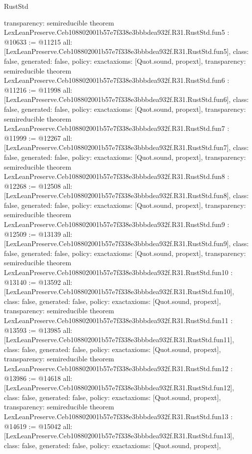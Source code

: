 \begin{lexlean}{RustStd}
\begin{coremodule}
{  transparency: semireducible
}
theorem LexLeanPreserve.Ceb108802001b57e7f338e3bbbdea932f.R31.RustStd.fun5 : @10633 := @11215 {
  all: [LexLeanPreserve.Ceb108802001b57e7f338e3bbbdea932f.R31.RustStd.fun5],
  class: false,
  generated: false,
  policy: exact{axioms: [Quot.sound, propext]},
  transparency: semireducible
}
theorem LexLeanPreserve.Ceb108802001b57e7f338e3bbbdea932f.R31.RustStd.fun6 : @11216 := @11998 {
  all: [LexLeanPreserve.Ceb108802001b57e7f338e3bbbdea932f.R31.RustStd.fun6],
  class: false,
  generated: false,
  policy: exact{axioms: [Quot.sound, propext]},
  transparency: semireducible
}
theorem LexLeanPreserve.Ceb108802001b57e7f338e3bbbdea932f.R31.RustStd.fun7 : @11999 := @12267 {
  all: [LexLeanPreserve.Ceb108802001b57e7f338e3bbbdea932f.R31.RustStd.fun7],
  class: false,
  generated: false,
  policy: exact{axioms: [Quot.sound, propext]},
  transparency: semireducible
}
theorem LexLeanPreserve.Ceb108802001b57e7f338e3bbbdea932f.R31.RustStd.fun8 : @12268 := @12508 {
  all: [LexLeanPreserve.Ceb108802001b57e7f338e3bbbdea932f.R31.RustStd.fun8],
  class: false,
  generated: false,
  policy: exact{axioms: [Quot.sound, propext]},
  transparency: semireducible
}
theorem LexLeanPreserve.Ceb108802001b57e7f338e3bbbdea932f.R31.RustStd.fun9 : @12509 := @13139 {
  all: [LexLeanPreserve.Ceb108802001b57e7f338e3bbbdea932f.R31.RustStd.fun9],
  class: false,
  generated: false,
  policy: exact{axioms: [Quot.sound, propext]},
  transparency: semireducible
}
theorem LexLeanPreserve.Ceb108802001b57e7f338e3bbbdea932f.R31.RustStd.fun10 : @13140 := @13592 {
  all: [LexLeanPreserve.Ceb108802001b57e7f338e3bbbdea932f.R31.RustStd.fun10],
  class: false,
  generated: false,
  policy: exact{axioms: [Quot.sound, propext]},
  transparency: semireducible
}
theorem LexLeanPreserve.Ceb108802001b57e7f338e3bbbdea932f.R31.RustStd.fun11 : @13593 := @13985 {
  all: [LexLeanPreserve.Ceb108802001b57e7f338e3bbbdea932f.R31.RustStd.fun11],
  class: false,
  generated: false,
  policy: exact{axioms: [Quot.sound, propext]},
  transparency: semireducible
}
theorem LexLeanPreserve.Ceb108802001b57e7f338e3bbbdea932f.R31.RustStd.fun12 : @13986 := @14618 {
  all: [LexLeanPreserve.Ceb108802001b57e7f338e3bbbdea932f.R31.RustStd.fun12],
  class: false,
  generated: false,
  policy: exact{axioms: [Quot.sound, propext]},
  transparency: semireducible
}
theorem LexLeanPreserve.Ceb108802001b57e7f338e3bbbdea932f.R31.RustStd.fun13 : @14619 := @15042 {
  all: [LexLeanPreserve.Ceb108802001b57e7f338e3bbbdea932f.R31.RustStd.fun13],
  class: false,
  generated: false,
  policy: exact{axioms: [Quot.sound, propext]},
}
\end{coremodule}
\end{lexlean}

